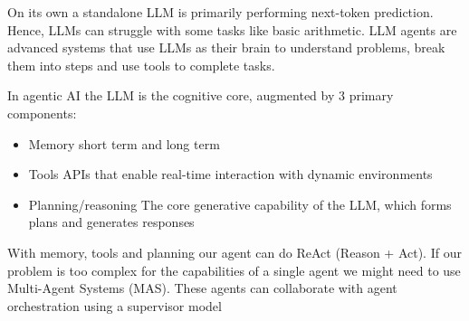 On its own a standalone LLM is primarily performing next-token prediction. Hence, LLMs can struggle with some tasks like basic arithmetic. LLM agents are advanced systems that use LLMs as their brain to understand problems, break them into steps and use tools to complete tasks. 

In agentic AI the LLM is the cognitive core, augmented by 3 primary components:

\begin{itemize}
    \item Memory \ra short term and long term
    \item Tools \ra APIs that enable real-time interaction with dynamic environments
    \item Planning/reasoning \ra The core generative capability of the LLM, which forms plans and generates responses
\end{itemize}

With memory, tools and planning our agent can do ReAct (Reason + Act). If our problem is too complex for the capabilities of a single agent we might need to use Multi-Agent Systems (MAS). These agents can collaborate with agent orchestration using a supervisor model


